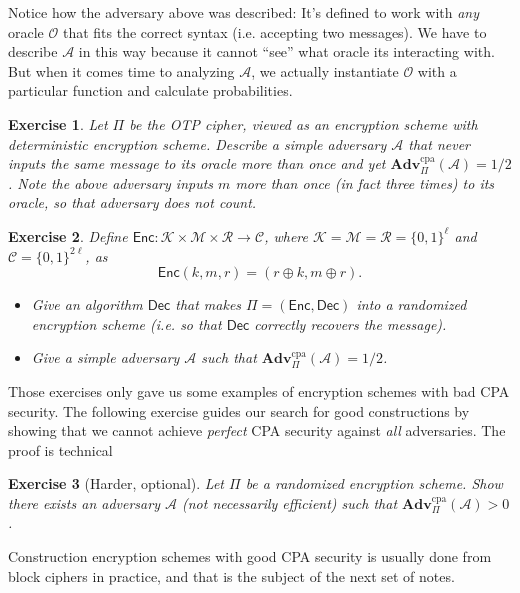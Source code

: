 \documentclass[11pt]{article}
\newtheorem{exercise}{Exercise}
\newcommand{\msgs}{\mathcal{M}}
\newcommand{\ctxts}{\mathcal{C}}
\newcommand{\keys}{\mathcal{K}}
\newcommand{\rands}{\mathcal{R}}
\newcommand{\Enc}{\mathsf{Enc}}
\newcommand{\Dec}{\mathsf{Dec}}
\newcommand{\calA}{\mathcal{A}}
\newcommand{\calO}{\mathcal{O}}
\newcommand{\Adv}{\mathbf{Adv}}
\newcommand{\AdvCPA}[2]{\Adv^{\mathrm{cpa}}_{#1}({#2})}
\newcommand{\bits}{\{0,1\}}
\begin{document}
Notice how the adversary above was described: It's defined to work with
\emph{any} oracle $\calO$ that fits the correct syntax (i.e. accepting two
messages). We have to describe $\calA$ in this way because it cannot ``see''
what oracle its interacting with. But when it comes time to analyzing $\calA$,
we actually instantiate $\calO$ with a particular function and calculate
probabilities.

\begin{exercise}
    Let $\Pi$ be the OTP cipher, viewed as an encryption scheme with
    deterministic encryption scheme. Describe a simple adversary $\calA$
    that never inputs the same message to its oracle more than once and yet
    $\AdvCPA{\Pi}{\calA} = 1/2$. Note the above adversary inputs $m$
    more than once (in fact three times) to its oracle, so that adversary
    does not count.
\end{exercise}

\begin{exercise}
    Define $\Enc:\keys\times\msgs\times\rands\to\ctxts$, where 
    $\keys=\msgs=\rands=\bits^\ell$ and $\ctxts = \bits^{2\ell}$, 
    as
    \[
        \Enc(k,m,r) = (r\oplus k, m\oplus r).
    \]
    \begin{itemize}

        \item Give an algorithm $\Dec$ that makes $\Pi = (\Enc,\Dec)$ into a
            randomized encryption scheme (i.e. so that $\Dec$ correctly
            recovers the message).

        \item Give a simple adversary $\calA$ such that $\AdvCPA{\Pi}{\calA} =
            1/2$.

    \end{itemize}

\end{exercise}

Those exercises only gave us some examples of encryption schemes with bad
CPA security.   The following exercise guides our search for good constructions
by showing that we cannot achieve
\emph{perfect} CPA security against \emph{all} adversaries.
The proof is technical
\begin{exercise}[Harder, optional]
    Let $\Pi$ be a randomized encryption scheme.  Show there exists an
    adversary $\calA$ (not necessarily efficient)
    such that $\AdvCPA{\Pi}{\calA} > 0$.
\end{exercise}
Construction encryption schemes with good CPA security is
usually done from block ciphers in practice, and that is the subject
of the next set of notes. 
\end{document}
